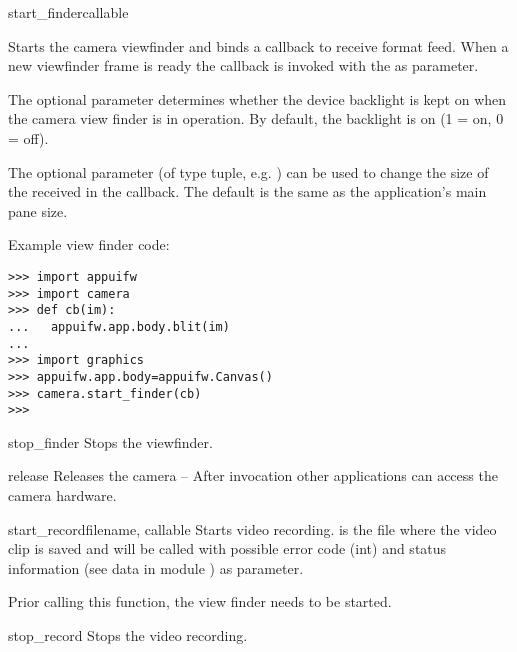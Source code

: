\begin{funcdesc}{start_finder}{callable}

Starts the camera viewfinder and binds a callback to receive  format 
feed. When a new viewfinder frame is ready the callback is invoked with the 
 as parameter.

The optional parameter  determines whether the device 
backlight is kept on when the camera view finder is in operation. By default, 
the backlight is on (1 = on, 0 = off).

The optional parameter  (of type tuple, e.g. ) can 
be used to change the size of the  received in the callback. The 
default  is the same as the application's main pane size. 

Example view finder code:

\begin{verbatim}
>>> import appuifw
>>> import camera
>>> def cb(im):
...   appuifw.app.body.blit(im)
...
>>> import graphics
>>> appuifw.app.body=appuifw.Canvas()
>>> camera.start_finder(cb)
>>>
\end{verbatim}

\end{funcdesc}

\begin{funcdesc}{stop_finder}{}
Stops the viewfinder.
\end{funcdesc}

\begin{funcdesc}{release}{}
Releases the camera -- After invocation other applications can access the camera 
hardware.
\end{funcdesc}

\begin{funcdesc}{start_record}{filename, callable}
Starts video recording.  is the file where the video clip is saved 
and  will be called with possible error code (int) and status 
information (see data in module ) as parameter.

Prior calling this function, the view finder needs to be started.
\end{funcdesc}

\begin{funcdesc}{stop_record}{}
Stops the video recording.
\end{funcdesc}
